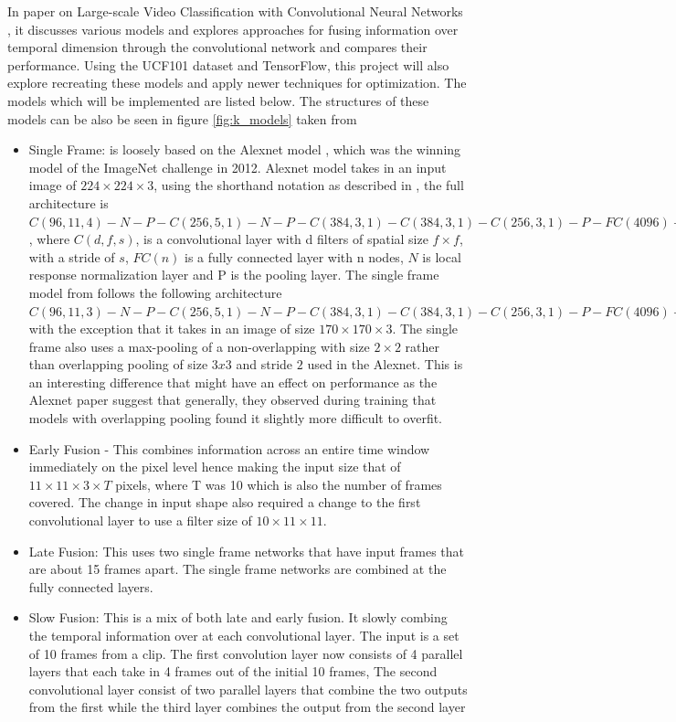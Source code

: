 In \citep{KarpathyCVPR14} paper on Large-scale Video Classification with Convolutional Neural Networks \citep{KarpathyCVPR14}, it discusses various models and explores approaches for fusing information over temporal dimension through the convolutional network and compares their performance. Using the UCF101 dataset and TensorFlow, this project will also explore recreating these models and apply newer techniques for optimization. The models which will be implemented are listed below. The structures of these models can be also be seen in figure \ref{fig:k_models} taken from \citep{KarpathyCVPR14}
\begin{itemize}
    \item Single Frame: is loosely based on the Alexnet model \cite{NIPS2012_4824}, which was the winning model of the ImageNet challenge in 2012. Alexnet model takes in an input image of $224 \times 224 \times 3$, using the shorthand notation as described in \citep{KarpathyCVPR14}, the full architecture is $C(96, 11, 4)-N-P-C(256, 5, 1)-N-P-C(384, 3, 1)-C(384, 3, 1)-C(256, 3, 1)-P-F C(4096)-F C(4096)$, where $C(d, f, s)$, is a convolutional layer with d filters of spatial size $ f × f$, with a stride of $s$,  $FC(n)$ is a fully connected layer with n nodes, $N$ is local response normalization layer and P is the pooling layer. The single frame model from \cite{KarpathyCVPR14} follows the following architecture  $C(96, 11, 3)-N-P-C(256, 5, 1)-N-P-C(384, 3, 1)-C(384, 3, 1)-C(256, 3, 1)-P-F C(4096)-FC(4096)$ with the exception that it takes in an image of size $ 170 \times 170 \times 3$. The single frame also uses a max-pooling of a non-overlapping with size $2 \times 2$ rather than overlapping pooling of size $3x3$ and stride $2$ used in the Alexnet. This is an interesting difference that might have an effect on performance as the Alexnet paper suggest that generally, they observed during training that models with overlapping pooling found it slightly more difficult to overfit.
    \item Early Fusion - This combines information across an entire time window immediately on the pixel level hence making the input size that of $11 \times 11 \times 3 \times T$ pixels, where T was 10 which is also the number of frames covered. The change in input shape also required a change to the first convolutional layer to use a filter size of $10 \times 11 \times 11$.
    \item Late Fusion: This uses two single frame networks that have input frames that are about 15 frames apart. The single frame networks are combined at the fully connected layers.
    \item Slow Fusion: This is a mix of both late and early fusion. It slowly combing the temporal information over at each convolutional layer. The input is a set of 10 frames from a clip. The first convolution layer now consists of 4 parallel layers that each take in 4 frames out of the initial 10 frames, The second convolutional layer consist of two parallel layers that combine the two outputs from the first while the third layer combines the output from the second layer
\end{itemize}

